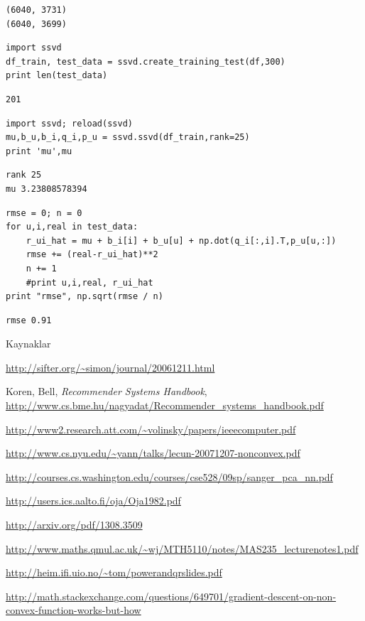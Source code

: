\documentclass[12pt,fleqn]{article}\usepackage{../common}
\begin{document}
\begin{verbatim}
(6040, 3731)
(6040, 3699)
\end{verbatim}

\begin{verbatim}
import ssvd
df_train, test_data = ssvd.create_training_test(df,300)
print len(test_data)
\end{verbatim}

\begin{verbatim}
201
\end{verbatim}


\begin{verbatim}
import ssvd; reload(ssvd)
mu,b_u,b_i,q_i,p_u = ssvd.ssvd(df_train,rank=25)
print 'mu',mu
\end{verbatim}

\begin{verbatim}
rank 25
mu 3.23808578394
\end{verbatim}


\begin{verbatim}
rmse = 0; n = 0
for u,i,real in test_data:
    r_ui_hat = mu + b_i[i] + b_u[u] + np.dot(q_i[:,i].T,p_u[u,:])
    rmse += (real-r_ui_hat)**2
    n += 1
    #print u,i,real, r_ui_hat
print "rmse", np.sqrt(rmse / n)
\end{verbatim}

\begin{verbatim}
rmse 0.91
\end{verbatim}










Kaynaklar

\url{http://sifter.org/~simon/journal/20061211.html}

Koren, Bell, {\em Recommender Systems Handbook},
\url{http://www.cs.bme.hu/nagyadat/Recommender_systems_handbook.pdf}

\url{http://www2.research.att.com/~volinsky/papers/ieeecomputer.pdf}

\url{http://www.cs.nyu.edu/~yann/talks/lecun-20071207-nonconvex.pdf}

\url{http://courses.cs.washington.edu/courses/cse528/09sp/sanger_pca_nn.pdf}

\url{http://users.ics.aalto.fi/oja/Oja1982.pdf}

\url{http://arxiv.org/pdf/1308.3509}

\url{http://www.maths.qmul.ac.uk/~wj/MTH5110/notes/MAS235_lecturenotes1.pdf}

\url{http://heim.ifi.uio.no/~tom/powerandqrslides.pdf}

\url{http://math.stackexchange.com/questions/649701/gradient-descent-on-non-convex-function-works-but-how}
\end{document}
